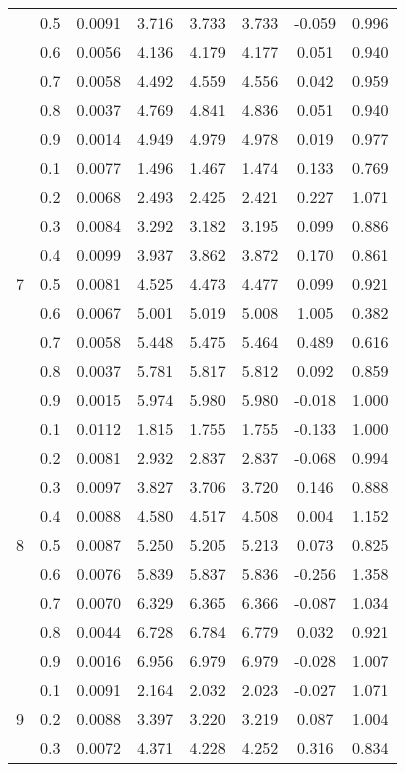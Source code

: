 \documentclass[11pt,a4paper]{report}
\begin{document}
\begin{longtable}{ | c | c || c | c | c | c | c | c | }
 & 0.5 & 0.0091 & 3.716 & 3.733 & 3.733 & -0.059 & 0.996 \\
 & 0.6 & 0.0056 & 4.136 & 4.179 & 4.177 & 0.051 & 0.940 \\
 & 0.7 & 0.0058 & 4.492 & 4.559 & 4.556 & 0.042 & 0.959 \\
 & 0.8 & 0.0037 & 4.769 & 4.841 & 4.836 & 0.051 & 0.940 \\
 & 0.9 & 0.0014 & 4.949 & 4.979 & 4.978 & 0.019 & 0.977 \\
 \hline
\multirow{9}{*}{7} & 0.1 & 0.0077 & 1.496 & 1.467 & 1.474 & 0.133 & 0.769 \\
 & 0.2 & 0.0068 & 2.493 & 2.425 & 2.421 & 0.227 & 1.071 \\
 & 0.3 & 0.0084 & 3.292 & 3.182 & 3.195 & 0.099 & 0.886 \\
 & 0.4 & 0.0099 & 3.937 & 3.862 & 3.872 & 0.170 & 0.861 \\
 & 0.5 & 0.0081 & 4.525 & 4.473 & 4.477 & 0.099 & 0.921 \\
 & 0.6 & 0.0067 & 5.001 & 5.019 & 5.008 & 1.005 & 0.382 \\
 & 0.7 & 0.0058 & 5.448 & 5.475 & 5.464 & 0.489 & 0.616 \\
 & 0.8 & 0.0037 & 5.781 & 5.817 & 5.812 & 0.092 & 0.859 \\
 & 0.9 & 0.0015 & 5.974 & 5.980 & 5.980 & -0.018 & 1.000 \\
 \hline
\multirow{9}{*}{8} & 0.1 & 0.0112 & 1.815 & 1.755 & 1.755 & -0.133 & 1.000 \\
 & 0.2 & 0.0081 & 2.932 & 2.837 & 2.837 & -0.068 & 0.994 \\
 & 0.3 & 0.0097 & 3.827 & 3.706 & 3.720 & 0.146 & 0.888 \\
 & 0.4 & 0.0088 & 4.580 & 4.517 & 4.508 & 0.004 & 1.152 \\
 & 0.5 & 0.0087 & 5.250 & 5.205 & 5.213 & 0.073 & 0.825 \\
 & 0.6 & 0.0076 & 5.839 & 5.837 & 5.836 & -0.256 & 1.358 \\
 & 0.7 & 0.0070 & 6.329 & 6.365 & 6.366 & -0.087 & 1.034 \\
 & 0.8 & 0.0044 & 6.728 & 6.784 & 6.779 & 0.032 & 0.921 \\
 & 0.9 & 0.0016 & 6.956 & 6.979 & 6.979 & -0.028 & 1.007 \\
 \hline
\multirow{9}{*}{9} & 0.1 & 0.0091 & 2.164 & 2.032 & 2.023 & -0.027 & 1.071 \\
 & 0.2 & 0.0088 & 3.397 & 3.220 & 3.219 & 0.087 & 1.004 \\
 & 0.3 & 0.0072 & 4.371 & 4.228 & 4.252 & 0.316 & 0.834 \\

\end{longtable}
\end{document}
